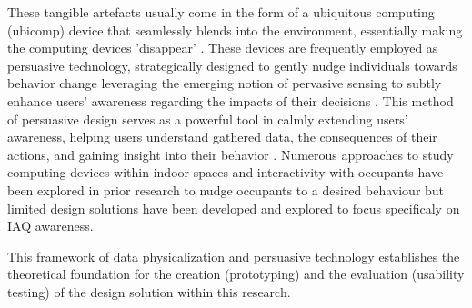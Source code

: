 These tangible artefacts usually come in the form of a ubiquitous computing (ubicomp) \cite{bell_yesterdays_2007} device that seamlessly blends into the environment, essentially making the computing devices 'disappear' \cite{weiser_computer_1999}. These devices are frequently employed as persuasive technology, strategically designed to gently nudge individuals towards behavior change leveraging the emerging notion of pervasive sensing to subtly enhance users' awareness regarding the impacts of their decisions \cite{bader_windowwall_2019, rogers_ambient_2010}. This method of persuasive design serves as a powerful tool in calmly extending users' awareness, helping users understand gathered data, the consequences of their actions, and gaining insight into their behavior \cite{bae_making_2022}. Numerous approaches to study computing devices within indoor spaces and interactivity with occupants have been explored in prior research \cite{sauve_physecology_2022} to nudge occupants to a desired behaviour but limited design solutions have been developed and explored to focus specificaly on IAQ awareness. 



This framework of data physicalization and persuasive technology establishes the theoretical foundation for the creation (prototyping) and the evaluation (usability testing) of the design solution within this research.